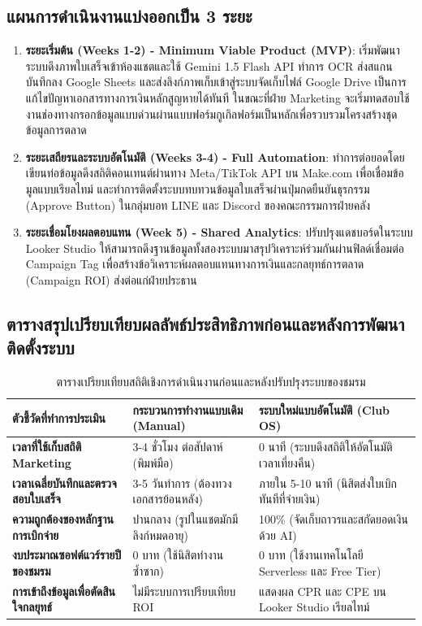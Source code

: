 \documentclass[10pt,a4paper]{article}
\begin{document}
\subsection{แผนการดำเนินงานแบ่งออกเป็น 3 ระยะ}
\begin{enumerate}[label=\bfseries ระยะที่ \arabic*:]
  \item \textbf{ระยะเริ่มต้น (Weeks 1-2) - Minimum Viable Product (MVP)}:
  เริ่มพัฒนาระบบดึงภาพใบเสร็จเข้าห้องแชตและใช้ Gemini 1.5 Flash API ทำการ OCR ส่งสแกนบันทึกลง Google Sheets และส่งลิงก์ภาพเก็บเข้าสู่ระบบจัดเก็บไฟล์ Google Drive เป็นการแก้ไขปัญหาเอกสารทางการเงินหลักสูญหายได้ทันที ในขณะที่ฝ่าย Marketing จะเริ่มทดสอบใช้งานช่องทางกรอกข้อมูลแบบด่วนผ่านแบบฟอร์มกูเกิลฟอร์มเป็นหลักเพื่อรวบรวมโครงสร้างชุดข้อมูลการตลาด
  
  \item \textbf{ระยะเสถียรและระบบอัตโนมัติ (Weeks 3-4) - Full Automation}:
  ทำการต่อยอดโดยเขียนท่อข้อมูลดึงสถิติคอนเทนต์ผ่านทาง Meta/TikTok API บน Make.com เพื่อเชื่อมข้อมูลแบบเรียลไทม์ และทำการติดตั้งระบบทบทวนข้อมูลใบเสร็จผ่านปุ่มกดยืนยันธุรกรรม (Approve Button) ในกลุ่มบอท LINE และ Discord ของคณะกรรมการฝ่ายคลัง
  
  \item \textbf{ระยะเชื่อมโยงผลตอบแทน (Week 5) - Shared Analytics}:
  ปรับปรุงแดชบอร์ดในระบบ Looker Studio ให้สามารถดึงฐานข้อมูลทั้งสองระบบมาสรุปวิเคราะห์ร่วมกันผ่านฟิลด์เชื่อมต่อ Campaign Tag เพื่อสร้างข้อวิเคราะห์ผลตอบแทนทางการเงินและกลยุทธ์การตลาด (Campaign ROI) ส่งต่อแก่ฝ่ายประธาน
\end{enumerate}

\subsection{ตารางสรุปเปรียบเทียบผลลัพธ์ประสิทธิภาพก่อนและหลังการพัฒนาติดตั้งระบบ}
\begin{table}[h!]
  \centering
  \caption{\chulafont ตารางเปรียบเทียบสถิติเชิงการดำเนินงานก่อนและหลังปรับปรุงระบบของชมรม}
  \begin{tabular}{lll}
    \toprule
    \textbf{ตัวชี้วัดที่ทำการประเมิน} & \textbf{กระบวนการทำงานแบบเดิม (Manual)} & \textbf{ระบบใหม่แบบอัตโนมัติ (Club OS)} \\
    \midrule
    \textbf{เวลาที่ใช้เก็บสถิติ Marketing} & 3-4 ชั่วโมง ต่อสัปดาห์ (พิมพ์มือ) & 0 นาที (ระบบดึงสถิติให้อัตโนมัติเวลาเที่ยงคืน) \\
    \textbf{เวลาเฉลี่ยบันทึกและตรวจสอบใบเสร็จ} & 3-5 วันทำการ (ต้องทวงเอกสารย้อนหลัง) & ภายใน 5-10 นาที (นิสิตส่งใบเบิกทันทีที่จ่ายเงิน) \\
    \textbf{ความถูกต้องของหลักฐานการเบิกจ่าย} & ปานกลาง (รูปในแชตมักมีลิงก์หมดอายุ) & 100\% (จัดเก็บถาวรและสกัดยอดเงินด้วย AI) \\
    \textbf{งบประมาณซอฟต์แวร์รายปีของชมรม} & 0 บาท (ใช้นิสิตทำงานซ้ำซาก) & 0 บาท (ใช้งานเทคโนโลยี Serverless และ Free Tier) \\
    \textbf{การเข้าถึงข้อมูลเพื่อตัดสินใจกลยุทธ์} & ไม่มีระบบการเปรียบเทียบ ROI & แสดงผล CPR และ CPE บน Looker Studio เรียลไทม์ \\
    \bottomrule
  \end{tabular}
\end{table}
\end{document}
